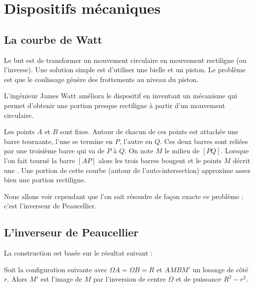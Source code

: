 \documentclass[11pt,class=report,crop=false]{standalone}
\begin{document}
\section{Dispositifs mécaniques}

\subsection{La courbe de Watt}

Le but est de transformer un mouvement circulaire en mouvement rectiligne
(ou l'inverse). Une solution simple est d'utiliser une bielle et un piston.
Le problème est que le coulissage génère des frottements au niveau du piston.


\bigskip

L'ingénieur James Watt améliora le dispositif en inventant un mécanisme
qui permet d'obtenir une portion presque rectiligne à partir d'un mouvement circulaire.


Les points $A$ et $B$ sont fixes. Autour de chacun de ces points est attachée une barre tournante, l'une se termine en $P$, l'autre en $Q$. Ces deux barres sont reliées par une troisième barre qui va de $P$ à $Q$. 
On note $M$ le milieu de $[PQ]$. Lorsque l'on fait tourné la barre $[AP]$ alors les trois barres bougent et le points $M$ décrit une . Une portion de cette courbe (autour de l'auto-intersection) approxime assez bien une portion rectiligne.

Nous allons voir cependant que l'on sait résoudre de façon exacte ce problème : c'est l'inverseur de Peaucellier.

\subsection{L'inverseur de Peaucellier}

La construction est basée sur le résultat suivant :
\begin{theoreme}
Soit la configuration suivante avec $\Omega A = \Omega B = R$
et $AMBM'$ un losange de côté $r$.
Alors $M'$ est l'image de $M$ par l'inversion de centre $\Omega$
et de puissance $R^2-r^2$.
\end{theoreme}
\end{document}
